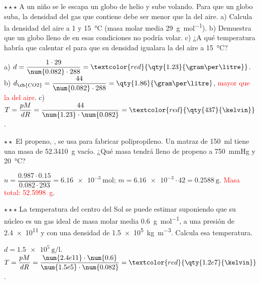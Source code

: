 \begin{exercise}
    \(\star\star\star\) A un niño se le escapa un globo de helio y sube volando. Para que un globo suba, la densidad del gas que contiene
    debe ser menor que la del aire. a) Calcula la densidad del aire a \qty{1}{\atm} y \qty{15}{\degreeCelsius} (masa molar media
    \qty{29}{\gram\per\mole}). b) Demuestra que un globo lleno de  en esas condiciones no podría volar. c) ¿A qué temperatura
    habría que calentar el  para que su densidad igualara la del aire a \qty{15}{\degreeCelsius}?
    \begin{solu}
        a) \(d = \dfrac{1 \cdot 29}{\num{0.082} \cdot 288} = \textcolor{red}{\qty{1.23}{\gram\per\litre}}\). b) \(d_{\ch{CO2}} = \dfrac{44}{\num{0.082} \cdot 288} =
        \qty{1.86}{\gram\per\litre}\), \textcolor{red}{mayor que la del aire}. c) \(T = \dfrac{p M}{d R} = \dfrac{44}{\num{1.23} \cdot \num{0.082}} =
        \textcolor{red}{\qty{437}{\kelvin}}\).
    \end{solu}
\end{exercise}

\begin{exercise}
    \(\star\star\) El propeno, , se usa para fabricar polipropileno. Un matraz de \qty{150}{\milli\litre} tiene una masa de
    \qty{52.3410}{\gram} vacío. ¿Qué masa tendrá lleno de propeno a \qty{750}{\mmHg} y \qty{20}{\degreeCelsius}?
    \begin{solu}
        \(n = \dfrac{\num{0.987} \cdot \num{0.15}}{\num{0.082} \cdot 293} = \qty{6.16e-3}{\mole}\); \(m = \num{6.16e-3} \cdot 42 = \qty{0.2588}{\gram}\).
        \textcolor{red}{Masa total: \qty{52.5998}{\gram}}.
    \end{solu}
\end{exercise}

\begin{exercise}
    \(\star\star\star\) La temperatura del centro del Sol se puede estimar suponiendo que su núcleo es un gas ideal de masa molar media
    \qty{0.6}{\gram\per\mole}, a una presión de \qty{2.4e11}{\atm} y con una densidad de \qty{1.5e5}{\kilogram\per\cubic\metre}. Calcula esa
    temperatura.
    \begin{solu}
        \(d = \qty{1.5e5}{\gram\per\litre}\). \(T = \dfrac{p M}{d R} = \dfrac{\num{2.4e11} \cdot \num{0.6}}{\num{1.5e5} \cdot \num{0.082}} =
        \textcolor{red}{\qty{1.2e7}{\kelvin}}\).
    \end{solu}
\end{exercise}

